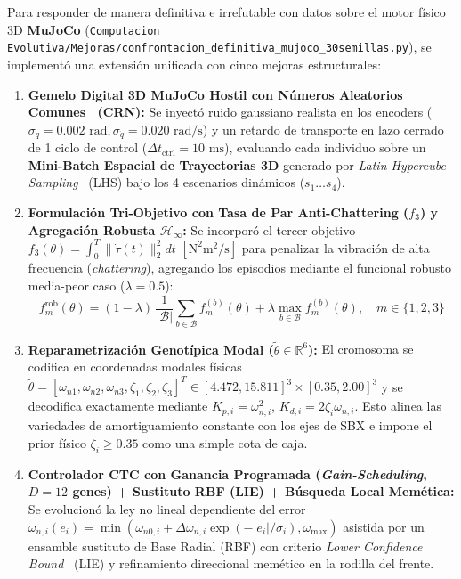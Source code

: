 \documentclass[11pt,a4paper]{article}
\begin{document}
Para responder de manera definitiva e irrefutable con datos sobre el motor físico 3D \textbf{MuJoCo} (\texttt{Computacion Evolutiva/Mejoras/confrontacion\_definitiva\_mujoco\_30semillas.py}), se implementó una extensión unificada con cinco mejoras estructurales:
\begin{enumerate}
    \item \textbf{Gemelo Digital 3D MuJoCo Hostil con Números Aleatorios Comunes~\cite{law2015} (CRN):} Se inyectó ruido gaussiano realista en los encoders ($\sigma_q = 0.002\text{ rad}, \sigma_{\dot{q}} = 0.020\text{ rad/s}$) y un retardo de transporte en lazo cerrado de 1 ciclo de control ($\Delta t_{\text{ctrl}} = 10\text{ ms}$), evaluando cada individuo sobre un \textbf{Mini-Batch Espacial de Trayectorias 3D} generado por \textit{Latin Hypercube Sampling}~\cite{mckay1979} (LHS) bajo los 4 escenarios dinámicos ($s_1 \dots s_4$).
    \item \textbf{Formulación Tri-Objetivo con Tasa de Par Anti-Chattering ($f_3$) y Agregación Robusta $\mathcal{H}_\infty$:} Se incorporó el tercer objetivo $f_3(\theta) = \int_0^T \|\dot{\tau}(t)\|_2^2 dt$ $[\text{N}^2\text{m}^2/\text{s}]$ para penalizar la vibración de alta frecuencia (\textit{chattering}), agregando los episodios mediante el funcional robusto media-peor caso ($\lambda = 0.5$):
    \begin{equation}
        f_m^{\text{rob}}(\theta) = (1-\lambda)\,\frac{1}{|\mathcal{B}|}\sum_{b \in \mathcal{B}} f_m^{(b)}(\theta) + \lambda \max_{b \in \mathcal{B}} f_m^{(b)}(\theta), \quad m \in \{1, 2, 3\}
        \label{eq:triobjetivo_rob}
    \end{equation}
    \item \textbf{Reparametrización Genotípica Modal ($\tilde{\theta} \in \mathbb{R}^6$):} El cromosoma se codifica en coordenadas modales físicas $\tilde{\theta} = [\omega_{n1}, \omega_{n2}, \omega_{n3}, \zeta_1, \zeta_2, \zeta_3]^T \in [4.472, 15.811]^3 \times [0.35, 2.00]^3$ y se decodifica exactamente mediante $K_{p,i} = \omega_{n,i}^2$, $K_{d,i} = 2\zeta_i\omega_{n,i}$. Esto alinea las variedades de amortiguamiento constante con los ejes de SBX e impone el prior físico $\zeta_i \ge 0.35$ como una simple cota de caja.
    \item \textbf{Controlador CTC con Ganancia Programada (\textit{Gain-Scheduling}, $D=12$ genes) + Sustituto RBF (LIE) + Búsqueda Local Memética:} Se evolucionó la ley no lineal dependiente del error $\omega_{n,i}(e_i) = \min(\omega_{n0,i} + \Delta\omega_{n,i}\exp(-|e_i|/\sigma_i), \omega_{\max})$ asistida por un ensamble sustituto de Base Radial (RBF) con criterio \textit{Lower Confidence Bound}~\cite{jones1998} (LIE) y refinamiento direccional memético en la rodilla del frente.

\end{enumerate}
\end{document}
